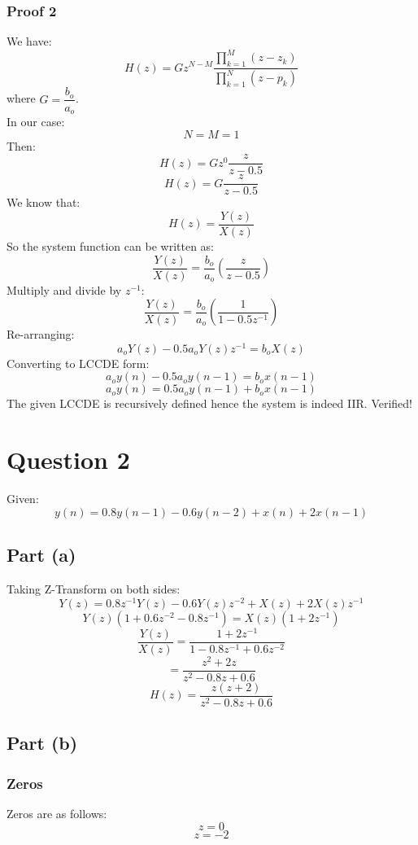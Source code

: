 \documentclass[12pt,letterpaper]{article}
\begin{document}
\subsubsection*{Proof 2}
We have: 
\[
    H(z) = G z^{N-M} \dfrac{\prod_{k=1}^{M} (z-z_k)}{\prod_{k=1}^N (z-p_k)}
\]
where $G = \dfrac{b_o}{a_o}$.\\
In our case: 
\[
    N=M=1
\]
Then: 
\[
    H(z) = G z^0 \dfrac{z}{z-0.5}
\]
\[
    H(z) = G \dfrac{z}{z-0.5}
\]
We know that: 
\[
    H(z) = \dfrac{Y(z)}{X(z)}
\]
So the system function can be written as: 
\[
    \dfrac{Y(z)}{X(z)} = \dfrac{b_o}{a_o} (\dfrac{z}{z-0.5})
\]
Multiply and divide by $z^{-1}$:
\[
    \dfrac{Y(z)}{X(z)} = \dfrac{b_o}{a_o} (\dfrac{1}{1-0.5z^{-1}})
\]
Re-arranging: 
\[
    a_o Y(z) - 0.5a_oY(z)z^{-1} = b_o X(z) 
\]
Converting to LCCDE form: 
\[
    a_o y(n) - 0.5 a_o y(n-1) = b_o x(n-1)
\]
\[
\boxed{
    a_o y(n) = 0.5 a_o y(n-1) + b_o x(n-1)
}
\]
The given LCCDE is recursively defined hence the system is indeed IIR. Verified!
\pagebreak
\section*{Question 2}
Given: 
\[
    y(n) = 0.8 y(n-1)-0.6y(n-2) + x(n)+ 2x(n-1)
\]
\subsection*{Part (a)}
Taking Z-Transform on both sides: 
\[
    Y(z) = 0.8 z^{-1}Y(z) -0.6Y(z) z^{-2} + X(z) + 2X(z) z^{-1}
\]
\[
    Y(z)(1+0.6z^{-2} - 0.8z^{-1}) =  X(z)(1+2z^{-1})
\]
\[
    \dfrac{Y(z)}{X(z)} = \dfrac{1+2z^{-1}}{1-0.8z^{-1} + 0.6z^{-2}}
\]
\[
    = \dfrac{z^2 + 2z}{z^2-0.8z + 0.6}
\]
\[
    H(z) = \dfrac{z(z + 2)}{z^2-0.8z + 0.6}
\]

\subsection*{Part (b)}
\subsubsection*{Zeros}
Zeros are as follows: 
\[
    z = 0
\]
\[
    z=-2
\]
\end{document}
